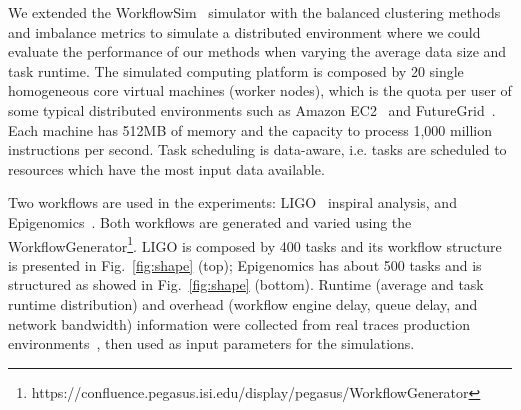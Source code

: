 \documentclass[final]{IEEEtran}
\begin{document}
We extended the WorkflowSim~\cite{WorkflowSim} simulator with the balanced clustering methods and imbalance metrics to simulate a distributed environment where we could evaluate the performance of our methods when varying the average data size and task runtime. The simulated computing platform is composed by 20 single homogeneous core virtual machines (worker nodes), which is the quota per user of some typical distributed environments such as Amazon EC2~\cite{AmazonAWS} and FutureGrid~\cite{FutureGrid}. Each machine has 512MB of memory and the capacity to process 1,000 million instructions per second. Task scheduling is data-aware, i.e. tasks are scheduled to resources which have the most input data available.

Two workflows are used in the experiments: LIGO~\cite{LIGO} inspiral analysis, and Epigenomics~\cite{Epigenome}. 
Both workflows are generated and varied using the WorkflowGenerator\footnote[1]{https://confluence.pegasus.isi.edu/display/pegasus/WorkflowGenerator}. LIGO is composed by 400 tasks and its workflow structure is presented in Fig.~\ref{fig:shape} (top); Epigenomics has about 500 tasks and is structured as showed in Fig.~\ref{fig:shape} (bottom). Runtime (average and task runtime distribution) and overhead (workflow engine delay, queue delay, and network bandwidth) information were collected from real traces production environments~\cite{Chen, Juve2013}, then used as input parameters for the simulations.

\end{document}
